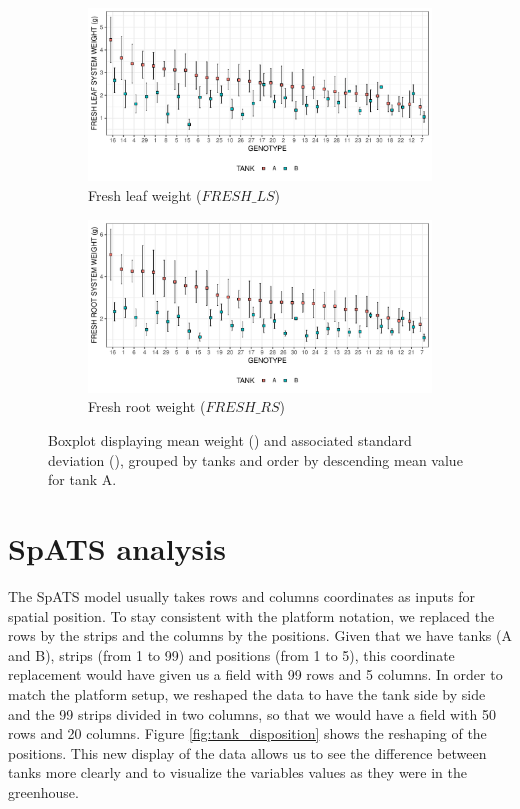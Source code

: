 \begin{figure}\ContinuedFloat
	\captionsetup[figure]{list=no}
	\begin{subfigure}[t]{\textwidth}
		\centering
		\includegraphics[width = \textwidth]{../../Figures/FRESH_LS_summary_plot.pdf}
		\caption{Fresh leaf weight ($FRESH\_LS$)}
	\end{subfigure}

	\begin{subfigure}[t]{\textwidth}
		\centering
		\includegraphics[width = \textwidth]{../../Figures/FRESH_RS_summary_plot.pdf}
		\caption{Fresh root weight ($FRESH\_RS$)}
	\end{subfigure}
	\caption[Boxplot of the mean weight and associated standard deviation]{Boxplot displaying mean weight (\protect\emptysquare) and associated standard deviation (\protect\blackline), grouped by tanks and order by descending mean value for tank A.}
	\label{fig:dotplot_all_variables}
\end{figure}

\section{SpATS analysis}
The SpATS model usually takes rows and columns coordinates as inputs for spatial position. To stay consistent with the platform notation, we replaced the rows by the strips and the columns by the positions. Given that we have tanks (A and B), strips (from 1 to 99) and positions (from 1 to 5), this coordinate replacement would have given us a field with 99 rows and 5 columns. In order to match the platform setup, we reshaped the data to have the tank side by side and the 99 strips divided in two columns, so that we would have a field with 50 rows and 20 columns. Figure \ref{fig:tank_disposition} shows the reshaping of the positions. This new display of the data allows us to see the difference between tanks more clearly and to visualize the variables values as they were in the greenhouse.

